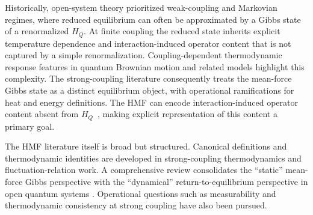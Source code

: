 Historically, open-system theory prioritized weak-coupling and Markovian
regimes, where reduced equilibrium can often be approximated by a Gibbs state of
a renormalized $H_Q$. At finite coupling the reduced state inherits explicit
temperature dependence and interaction-induced operator content that is not
captured by a simple renormalization. Coupling-dependent thermodynamic response
features in quantum Brownian motion and related models highlight this
complexity\cite{hanggiFiniteQuantumDissipation2008,ingoldSpecificHeatAnomalies2009}.
The strong-coupling literature consequently treats the mean-force Gibbs state as
a distinct equilibrium object, with operational ramifications for heat and
energy definitions\cite{espositoNatureHeatStrongly2015,rivasStrongCouplingThermodynamics2020,strasbergMeasurabilityNonequilibriumThermodynamics2020,millerEntropyProduction2017}.  The HMF can encode interaction-induced operator content absent from $H_Q$~\cite{hanggiFiniteQuantumDissipation2008,ingoldSpecificHeatAnomalies2009,correaPotentialRenormalisationLamb2025}, making explicit representation of this content a primary goal.

The HMF literature itself is broad but structured. Canonical definitions and
thermodynamic identities are developed in strong-coupling thermodynamics and
fluctuation-relation work\cite{campisiFluctuationTheoremArbitrary2009,jarzynskiNonequilibriumWorkTheorem2004,seifertFirstSecondLaw2016,talknerColloquiumStatisticalMechanics2020}.
A comprehensive review consolidates the ``static'' mean-force Gibbs perspective
with the ``dynamical'' return-to-equilibrium perspective in open quantum systems
\cite{trushechkinOpenQuantumSystem2022}.
Operational questions such as measurability and thermodynamic consistency at
strong coupling have also been pursued\cite{strasbergMeasurabilityNonequilibriumThermodynamics2020,rivasStrongCouplingThermodynamics2020,millerEntropyProduction2017}.

